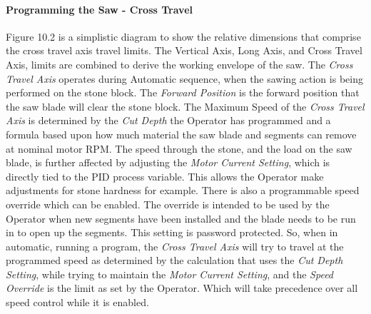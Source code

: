 \paragraph*{Programming the Saw - Cross Travel}Figure 10.2 is a simplistic diagram to show the relative dimensions that comprise the cross travel axis travel limits. The Vertical Axis, Long Axis, and Cross Travel Axis, limits are combined to derive the working envelope of the saw. The \textit{Cross Travel Axis} operates during Automatic sequence, when the sawing action is being performed on the stone block. The \textit{Forward Position} is the forward position that the saw blade will clear the stone block. The Maximum Speed of the \textit{Cross Travel Axis} is determined by the \textit{Cut Depth} the Operator has programmed and a formula based upon how much material the saw blade and segments can remove at nominal motor RPM. The speed through the stone, and the load on the saw blade, is further affected by adjusting the \textit{Motor Current Setting}, which is directly tied to the PID process variable. This allows the Operator make adjustments for stone hardness for example. There is also a programmable speed override which can be enabled. The override is intended to be used by the Operator when new segments have been installed and the blade needs to be run in to open up the segments. This setting is password protected. So, when in automatic, running a program, the \textit{Cross Travel Axis} will try to travel at the programmed speed as determined by the calculation that uses the \textit{Cut Depth Setting}, while trying to maintain the \textit{Motor Current Setting}, and the \textit{Speed Override} is the limit as set by the Operator. Which will take precedence over all speed control while it is enabled.
